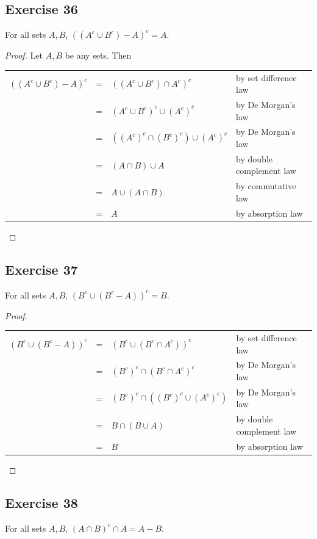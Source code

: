 \documentclass[14pt]{extarticle}
\newcommand{\cy}{\color{cyan}}
\begin{document}
\subsection{Exercise 36}
For all sets $A, B$, \(((A^c \cup B^c) - A)^c = A\).

\begin{proof}
Let $A,B$ be any sets. Then
\begin{center}
\begin{tabular}{rcll}
\(((A^c \cup B^c) - A)^c\) & = & \(((A^c \cup B^c) \cap A^c)^c\) & {\cy by set difference law} \\
\(\) & = & \((A^c \cup B^c)^c \cup (A^c)^c\) & {\cy by De Morgan's law} \\
\(\) & = & \(((A^c)^c \cap (B^c)^c) \cup (A^c)^c\) & {\cy by De Morgan's law} \\
\(\) & = & \((A \cap B) \cup A\) & {\cy by double complement law} \\
\(\) & = & \(A \cup (A \cap B)\) & {\cy by commutative law} \\
\(\) & = & \(A\) & {\cy by absorption law}
\end{tabular}
\end{center}
\end{proof}

\subsection{Exercise 37}
For all sets $A, B$, \((B^c \cup (B^c - A))^c = B\).

\begin{proof}
\begin{center}
\begin{tabular}{rcll}
\((B^c \cup (B^c - A))^c\) & = & \((B^c \cup (B^c \cap A^c))^c\) & {\cy by set difference law} \\
\(\) & = & \((B^c)^c \cap (B^c \cap A^c)^c\) & {\cy by De Morgan's law} \\
\(\) & = & \((B^c)^c \cap ((B^c)^c \cup (A^c)^c)\) & {\cy by De Morgan's law} \\
\(\) & = & \(B \cap (B \cup A)\) & {\cy by double complement law} \\
\(\) & = & \(B\) & {\cy by absorption law}
\end{tabular}
\end{center}
\end{proof}

\subsection{Exercise 38}
For all sets $A, B$, \((A \cap B)^c \cap A = A - B\).
\end{document}
